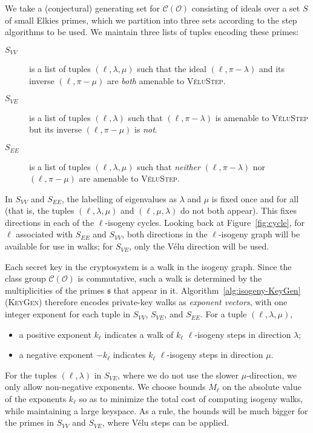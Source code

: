 \documentclass{llncs}
\newcommand{\Cl}{\mathcal{C}}
\renewcommand{\O}{\mathcal{O}}
\newcommand{\algstyle}[1]{\textsc{#1}}
\renewcommand{\frak}{\mathfrak}
\begin{document}
We take a (conjectural) generating set for $\Cl(\O)$ consisting of ideals over a set 
$S$ of small Elkies primes,
which we partition into three sets according to the step algorithms to be used.
We maintain three lists of tuples encoding these primes:

\begin{description}
    \item[$S_{VV}$]
        \label{case:velustep-sym}
        is a list of tuples $(\ell,\lambda,\mu)$
        such that the ideal $(\ell,\pi - \lambda)$ 
        and its inverse $(\ell,\pi-\mu)$
        are \emph{both} amenable to \algstyle{VéluStep}.
    \item[$S_{VE}$]
        \label{case:velustep-asym}
        is a list of tuples $(\ell,\lambda)$
        such that $(\ell,\pi-\lambda)$ is amenable to
        \algstyle{VéluStep} but its inverse $(\ell,\pi-\mu)$ is \emph{not}.
    \item[$S_{EE}$]
        \label{case:elkstep} 
        is a list of tuples $(\ell,\lambda,\mu)$
        such that \emph{neither} $(\ell,\pi - \lambda)$ nor $(\ell,\pi-\mu)$
        are amenable to \algstyle{VéluStep}.
\end{description}

In $S_{VV}$ and $S_{EE}$,
the labelling of eigenvalues as $\lambda$ and $\mu$ 
is fixed once and for all 
(that is, the tuples $(\ell,\lambda,\mu)$ and $(\ell,\mu,\lambda)$ do not
both appear).
This fixes directions in each of the $\ell$-isogeny cycles.
Looking back at Figure~\ref{fig:cycle}, 
for $\ell$ associated with $S_{EE}$ and $S_{VV}$, 
both directions in the $\ell$-isogeny graph will be available for use in
walks; for $S_{VE}$, only the Vélu direction will be used.

Each secret key in the cryptosystem is a walk in the isogeny graph.
Since the class group $\Cl(\O)$ is commutative, 
such a walk is determined by the multiplicities of the primes $\frak{s}$
that appear in it.
Algorithm~\ref{alg:isogeny-KeyGen} (\algstyle{KeyGen})
therefore encodes private-key walks as \emph{exponent vectors},
with one integer exponent for each tuple in $S_{VV}$, $S_{VE}$, and $S_{EE}$.
For a tuple $(\ell,\lambda,\mu)$,
\begin{itemize}
    \item
a positive exponent $k_\ell$ indicates a walk of $k_\ell$ $\ell$-isogeny
steps in direction $\lambda$;
\item
a negative exponent $-k_\ell$ indicates $k_\ell$
$\ell$-isogeny steps in direction $\mu$.
\end{itemize}
For the tuples $(\ell,\lambda)$ in $S_{VE}$, 
where we do not use the slower $\mu$-direction,
we only allow non-negative exponents.
We choose bounds $M_\ell$ on the absolute value of the exponents $k_\ell$
so as to minimize the total cost of computing isogeny walks, 
while maintaining a large keyspace.
As a rule, the bounds will be much bigger for the primes
in $S_{VV}$ and $S_{VE}$, where Vélu steps can be applied.
\end{document}
